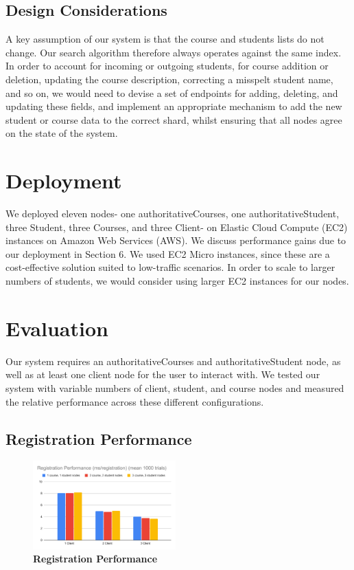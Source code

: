 \documentclass[sigplan, screen, 10pt]{acmart}
\begin{document}
\subsection{Design Considerations}
A key assumption of our system is that the course and students lists do not change. Our search algorithm therefore always operates against the same index. In order to account for incoming or outgoing students, for course addition or deletion, updating the course description, correcting a misspelt student name, and so on, we would need to devise a set of endpoints for adding, deleting, and updating these fields, and implement an appropriate mechanism to add the new student or course data to the correct shard, whilst ensuring that all nodes agree on the state of the system.

\section{Deployment}
We deployed eleven nodes- one authoritativeCourses, one authoritativeStudent, three Student, three Courses, and three Client- on Elastic Cloud Compute (EC2) instances on Amazon Web Services (AWS). We discuss performance gains due to our deployment in Section 6. We used EC2 Micro instances, since these are a cost-effective solution suited to low-traffic scenarios. In order to scale to larger numbers of students, we would consider using larger EC2 instances for our nodes.

\section{Evaluation}
Our system requires an authoritativeCourses and authoritativeStudent node, as well as at least one client node for the user to interact with. We tested our system with variable numbers of client, student, and course nodes and measured the relative performance across these different configurations.

\subsection{Registration Performance}

\begin{figure}[!htb]
  \centering
  \includegraphics[width=0.49\textwidth]{./figs/registrationperformance.pdf}
  \caption{
    \textbf{Registration Performance}
  }
\end{figure}
\end{document}
